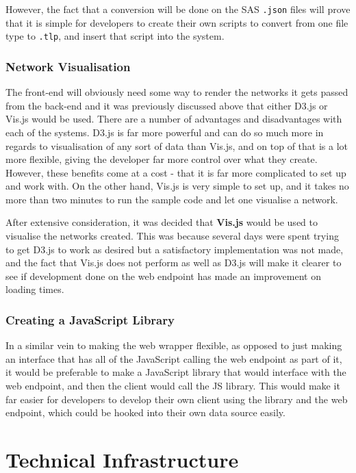 \documentclass[../dissertation.tex]{subfiles}
\begin{document}
However, the fact that a conversion will be done on the SAS \texttt{.json} files will prove that it is simple for developers to create their own scripts to convert from one file type to \texttt{.tlp}, and insert that script into the system.

\subsubsection{Network Visualisation}

The front-end will obviously need some way to render the networks it gets passed from the back-end and it was previously discussed above that either D3.js or Vis.js would be used. There are a number of advantages and disadvantages with each of the systems. D3.js is far more powerful and can do so much more in regards to visualisation of any sort of data than Vis.js, and on top of that is a lot more flexible, giving the developer far more control over what they create. However, these benefits come at a cost - that it is far more complicated to set up and work with. On the other hand, Vis.js is very simple to set up, and it takes no more than two minutes to run the sample code and let one visualise a network. 

After extensive consideration, it was decided that \textbf{Vis.js} would be used to visualise the networks created. This was because several days were spent trying to get D3.js to work as desired but a satisfactory implementation was not made, and the fact that Vis.js does not perform as well as D3.js will make it clearer to see if development done on the web endpoint has made an improvement on loading times.

\subsubsection{Creating a JavaScript Library}
In a similar vein to making the web wrapper flexible, as opposed to just making an interface that has all of the JavaScript calling the web endpoint as part of it, it would be preferable to make a JavaScript library that would interface with the web endpoint, and then the client would call the JS library. This would make it far easier for developers to develop their own client using the library and the web endpoint, which could be hooked into their own data source easily.

\section{Technical Infrastructure}
\end{document}
